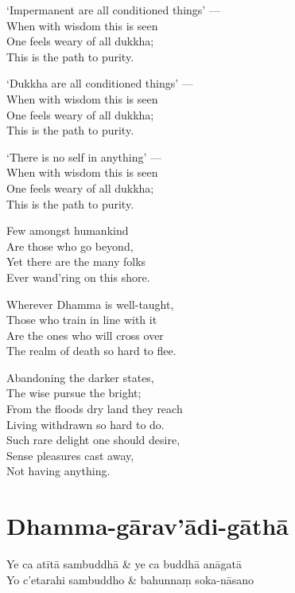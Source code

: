 \begin{paritta}
`Impermanent are all conditioned things' ---\\
When with wisdom this is seen\\
One feels weary of all dukkha;\\
This is the path to purity.

`Dukkha are all conditioned things' ---\\
When with wisdom this is seen\\
One feels weary of all dukkha;\\
This is the path to purity.

`There is no self in anything' ---\\
When with wisdom this is seen\\
One feels weary of all dukkha;\\
This is the path to purity.

Few amongst humankind\\
Are those who go beyond,\\
Yet there are the many folks\\
Ever wand'ring on this shore.

Wherever Dhamma is well-taught,\\
Those who train in line with it\\
Are the ones who will cross over\\
The realm of death so hard to flee.

Abandoning the darker states,\\
The wise pursue the bright;\\
From the floods dry land they reach\\
Living withdrawn so hard to do.\\
Such rare delight one should desire,\\
Sense pleasures cast away,\\
Not having anything.

\section{Dhamma-gārav'ādi-gāthā}



\begin{twochants}
  Ye ca atītā sambuddhā & ye ca buddhā anāgatā \\
  Yo c'etarahi sambuddho & bahunnaṃ soka-nāsano \\
\end{twochants}


\end{paritta}
